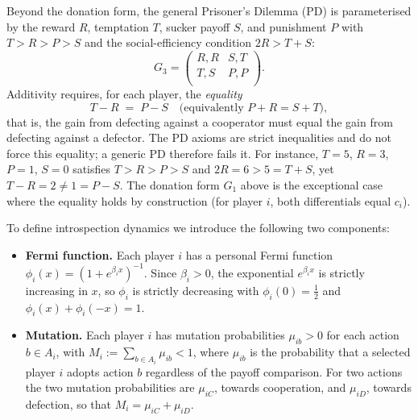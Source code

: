\documentclass[11pt]{article}
\begin{document}
Beyond the donation form, the general Prisoner's Dilemma (PD) is
parameterised by the
reward \(R\), temptation \(T\), sucker payoff \(S\), and punishment \(P\) with
\(T > R > P > S\) and the social-efficiency condition \(2R > T + S\):
\[
  G_3 = \begin{pmatrix}
      R, R & S, T\\
      T, S & P, P\\
  \end{pmatrix}.
\]
Additivity requires, for each player, the \emph{equality}
\[
  T - R \;=\; P - S \quad \text{(equivalently } P + R = S + T\text{)},
\]
that is, the gain from defecting against a cooperator must equal the gain from
defecting against a defector. The PD axioms are strict inequalities and do not
force this equality; a generic PD therefore fails it. For
instance, \(T=5\), \(R=3\), \(P=1\), \(S=0\) satisfies \(T>R>P>S\) and
\(2R=6>5=T+S\), yet \(T-R=2\neq 1=P-S\). The donation form \(G_1\) above is the
exceptional case where the equality holds by construction (for player \(i\),
both differentials equal \(c_i\)).

To define introspection dynamics we introduce the following two components:

\begin{itemize}
    \item \textbf{Fermi function.} Each player \(i\) has a personal Fermi function
\(\phi_i(x)=(1+e^{\beta_i x})^{-1}\). Since \(\beta_i>0\), the exponential
\(e^{\beta_i x}\) is strictly increasing in \(x\), so \(\phi_i\) is strictly
decreasing with \(\phi_i(0)=\tfrac{1}{2}\) and \(\phi_i(x)+\phi_i(-x)=1\).
    \item \textbf{Mutation.} Each player \(i\) has mutation probabilities
\(\mu_{ib}>0\) for each action \(b\in A_i\), with
\(M_i:=\sum_{b\in A_i}\mu_{ib}<1\), where \(\mu_{ib}\) is the probability
that a selected player \(i\) adopts action \(b\) regardless of the payoff
comparison. For two actions the two mutation probabilities are
\(\mu_{iC}\), towards cooperation, and \(\mu_{iD}\), towards defection, so
that \(M_i=\mu_{iC}+\mu_{iD}\).
\end{itemize}
\end{document}
